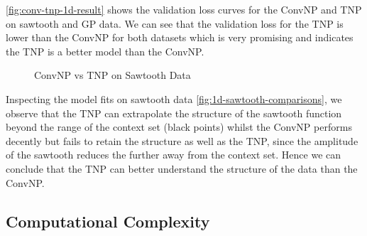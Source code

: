 \documentclass[../../main.tex]{subfiles}
\begin{document}
\autoref{fig:conv-tnp-1d-result} shows the validation loss curves for the ConvNP and TNP on sawtooth and GP data. We can see that the validation loss for the TNP is lower than the ConvNP for both datasets which is very promising and indicates the TNP is a better model than the ConvNP. 


\begin{figure}[H]
	\centering
	\qquad
	\caption{ConvNP vs TNP on Sawtooth Data}
	\label{fig:1d-sawtooth-comparisons}
\end{figure}

Inspecting the model fits on sawtooth data \autoref{fig:1d-sawtooth-comparisons}, we observe that the TNP can extrapolate the structure of the sawtooth function beyond the range of the context set (black points) whilst the ConvNP performs decently but fails to retain the structure as well as the TNP, since the amplitude of the sawtooth reduces the further away from the context set. Hence we can conclude that the TNP can better understand the structure of the data than the ConvNP.

\subsection{Computational Complexity}
\end{document}
